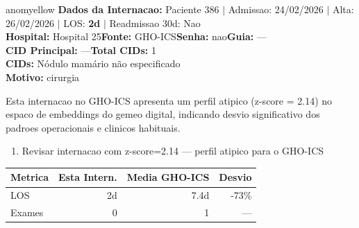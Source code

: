 \documentclass[a4paper,10pt]{article}
\begin{document}
\begin{anomalycard}[Internacao 322 | GHO-ICS | MODERADO (z=2.14)]{anomyellow}
\textbf{Dados da Internacao:} Paciente 386 $\mid$ Admissao: 24/02/2026 $\mid$ Alta: 26/02/2026 $\mid$ LOS: \textbf{2d} $\mid$ Readmissao 30d: Nao\\
\textbf{Hospital:} Hospital 25\quad\textbf{Fonte:} GHO-ICS\quad\textbf{Senha:} nao\quad\textbf{Guia:} ---\\
\textbf{CID Principal:} {\small ---}\quad\textbf{Total CIDs:} 1\\

\textbf{CIDs:} {\scriptsize Nódulo mamário não especificado}\\

\textbf{Motivo:} {\scriptsize cirurgia}\\

\vspace{2pt}\begin{tcolorbox}[colback=severityred!20,colframe=anomyellow,title={\textbf{Interpretacao de Negocio}},fonttitle=\bfseries\small,left=4pt,right=4pt,top=3pt,bottom=3pt]
{\small Esta internacao no GHO-ICS apresenta um perfil atipico (z-score = 2.14) no espaco de embeddings do gemeo digital, indicando desvio significativo dos padroes operacionais e clinicos habituais.}
\end{tcolorbox}
\begin{tcolorbox}[colback=severityyellow!30,colframe=anomorange,title={\textbf{Recomendacoes Especificas}},fonttitle=\bfseries\small,left=4pt,right=4pt,top=3pt,bottom=3pt]
\begin{enumerate}[nosep,leftmargin=16pt]
\item {\small Revisar internacao com z-score=2.14 --- perfil atipico para o GHO-ICS}
\end{enumerate}
\end{tcolorbox}
\begin{center}\begin{tabular}{l r r r}\toprule\textbf{Metrica} & \textbf{Esta Intern.} & \textbf{Media GHO-ICS} & \textbf{Desvio} \\\midrule
LOS & 2d & 7.4d & -73\% \\
Exames & 0 & 1 & --- \\
\bottomrule\end{tabular}\end{center}


\end{anomalycard}
\end{document}
